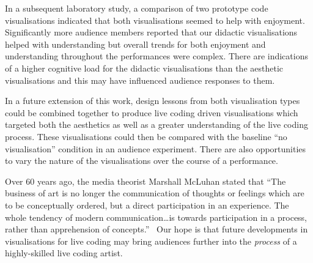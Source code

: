 \documentclass{sig-alternate}
\begin{document}
In a subsequent laboratory study, a comparison of two prototype code
visualisations indicated that both visualisations seemed to help with
enjoyment. Significantly more audience members reported that our
didactic visualisations helped with understanding but overall trends
for both enjoyment and understanding throughout the performances were
complex. There are indications of a higher cognitive load for the
didactic visualisations than the aesthetic visualisations and this may
have influenced audience responses to them.

In a future extension of this work, design lessons from both
visualisation types could be combined together to produce live coding
driven visualisations which targeted both the aesthetics as well as a
greater understanding of the live coding process. These visualisations
could then be compared with the baseline ``no visualisation''
condition in an audience experiment. There are also opportunities to
vary the nature of the visualisations over the course of a
performance.

Over 60 years ago, the media theorist Marshall McLuhan stated that
``The business of art is no longer the communication of thoughts or
feelings which are to be conceptually ordered, but a direct
participation in an experience. The whole tendency of modern
communication\ldots is towards participation in a process, rather than
apprehension of concepts.''~\cite{McLuhan} Our hope is that future
developments in visualisations for live coding may bring audiences
further into the \emph{process} of a highly-skilled live coding
artist.


\end{document}
